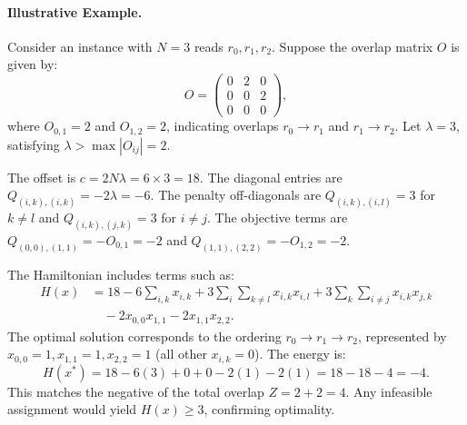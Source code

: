 \documentclass[12pt]{article}
\begin{document}
\paragraph{Illustrative Example.}
Consider an instance with $N=3$ reads $r_0, r_1, r_2$. Suppose the overlap matrix $O$ is given by:
\begin{equation}
    O = \begin{pmatrix}
        0 & 2 & 0 \\
        0 & 0 & 2 \\
        0 & 0 & 0
    \end{pmatrix},
\end{equation}
where $O_{0,1}=2$ and $O_{1,2}=2$, indicating overlaps $r_0 \to r_1$ and $r_1 \to r_2$. Let $\lambda = 3$, satisfying $\lambda > \max |O_{ij}| = 2$.

The offset is $c = 2N\lambda = 6 \times 3 = 18$.
The diagonal entries are $Q_{(i,k),(i,k)} = -2\lambda = -6$.
The penalty off-diagonals are $Q_{(i,k),(i,l)} = 3$ for $k \neq l$ and $Q_{(i,k),(j,k)} = 3$ for $i \neq j$.
The objective terms are $Q_{(0,0),(1,1)} = -O_{0,1} = -2$ and $Q_{(1,1),(2,2)} = -O_{1,2} = -2$.

The Hamiltonian includes terms such as:
\begin{align}
    H(x) &= 18 - 6 \sum_{i,k} x_{i,k} + 3 \sum_{i} \sum_{k \neq l} x_{i,k} x_{i,l} + 3 \sum_{k} \sum_{i \neq j} x_{i,k} x_{j,k} \nonumber \\
    &\quad - 2 x_{0,0} x_{1,1} - 2 x_{1,1} x_{2,2}.
\end{align}
The optimal solution corresponds to the ordering $r_0 \to r_1 \to r_2$, represented by $x_{0,0}=1, x_{1,1}=1, x_{2,2}=1$ (all other $x_{i,k}=0$). The energy is:
\begin{equation}
    H(x^*) = 18 - 6(3) + 0 + 0 - 2(1) - 2(1) = 18 - 18 - 4 = -4.
\end{equation}
This matches the negative of the total overlap $Z = 2+2=4$. Any infeasible assignment would yield $H(x) \ge 3$, confirming optimality.
\end{document}
